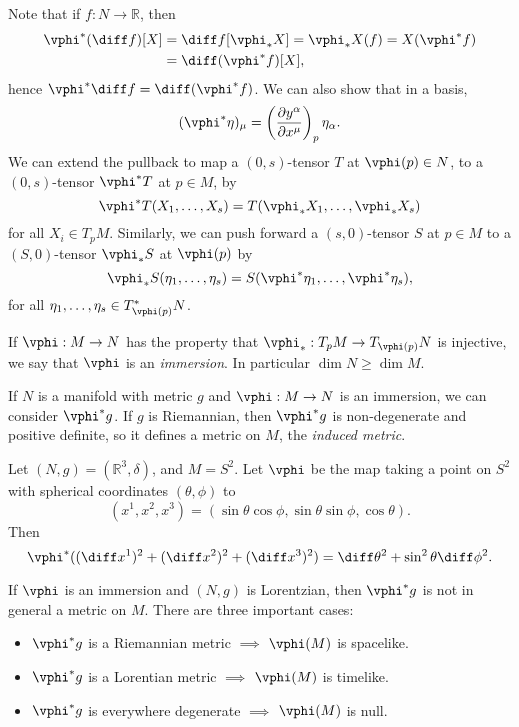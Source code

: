\documentclass[12pt]{article}
\begin{document}
Note that if $f : N \to \mathbb{R}$, then
\begin{align*}
	\vphi^{\ast}(\diff f)[X] &= \diff f[\vphi_\ast X] = \vphi_\ast X(f) = X(\vphi^{\ast} f) \\
				 &= \diff (\vphi^{\ast} f)[X],
\end{align*}
hence $\vphi^{\ast} \diff f = \diff (\vphi^{\ast} f)$. We can also show that in a basis,
\[
	(\vphi^{\ast} \eta)_\mu = \left( \frac{\partial y^{\alpha}}{\partial x^{\mu}} \right)_p \eta_\alpha.
\]
We can extend the pullback to map a $(0, s)$-tensor $T$ at $\vphi(p) \in N$, to a $(0, s)$-tensor $\vphi^{\ast} T$ at $p \in M$, by
\[
\vphi^{\ast} T (X_1, \ldots, X_s) = T(\vphi_\ast X_1, \ldots, \vphi_\ast X_s)
\]
for all $X_i \in T_p M$. Similarly, we can push forward a $(s, 0)$-tensor $S$ at $p \in M$ to a $(S, 0)$-tensor $\vphi_\ast S$ at $\vphi(p)$ by
\[
\vphi_\ast S(\eta_1, \ldots, \eta_s) = S(\vphi^{\ast} \eta_1, \ldots, \vphi^{\ast} \eta_s),
\]
for all $\eta_1, \ldots, \eta_s \in T_{\vphi(p)}^{\ast} N$.

If $\vphi : M \to N$ has the property that $\vphi_{\ast} : T_p M \to T_{\vphi(p)} N$ is injective, we say that $\vphi$ is an \emph{immersion}. In particular $\dim N \geq \dim M$.

If $N$ is a manifold with metric $g$ and $\vphi : M \to N$ is an immersion, we can consider $\vphi^{\ast} g$. If $g$ is Riemannian, then $\vphi^{\ast} g$ is non-degenerate and positive definite, so it defines a metric on $M$, the \emph{induced metric}.


\begin{exbox}
	Let $(N, g) = (\mathbb{R}^3, \delta)$, and $M = S^2$. Let $\vphi$ be the map taking a point on $S^2$ with spherical coordinates $(\theta, \phi)$ to
	\[
		(x^1, x^2, x^3) = (\sin \theta \cos \phi, \sin \theta \sin \phi, \cos \theta).
	\]
	Then
	\[
	\vphi^{\ast}((\diff x^1)^2 + (\diff x^2)^2 + (\diff x^3)^2) = \diff \theta^2 + \sin^2\theta \diff \phi^2.
	\]
\end{exbox}

If $\vphi$ is an immersion and $(N, g)$ is Lorentzian, then $\vphi^{\ast} g$ is not in general a metric on $M$. There are three important cases:
\begin{itemize}
	\item $\vphi^{\ast} g$ is a Riemannian metric $\implies$ $\vphi(M)$ is spacelike.
	\item $\vphi^{\ast} g$ is a Lorentian metric $\implies$ $\vphi(M)$ is timelike.
	\item $\vphi^{\ast} g$ is everywhere degenerate $\implies$ $\vphi(M)$ is null.
\end{itemize}
\end{document}
